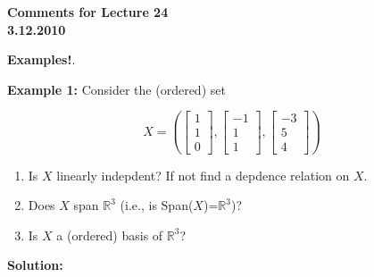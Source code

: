 \documentclass[12pt]{article}
\begin{document}
\begin{center}
{\large \bf Comments for Lecture 24}\\
\bf{3.12.2010}
\end{center}


\begin{center}{\LARGE \bf Examples!}.\end{center}


{\bf Example 1:}  Consider the (ordered) set 

\[X = \left( \left[ \begin{array}{r} 1 \\ 1  \\ 0  \end{array} \right], \left[ \begin{array}{r} -1 \\  1 \\ 1  \end{array} \right], \left[ \begin{array}{r}-3 \\ 5  \\ 4  \end{array} \right] \right) \]

\begin{enumerate}
\item Is $X$ linearly indepdent?  If not find a depdence relation on $X$.
\item Does $X$ span $\mathbb{R}^3$ (i.e., is Span($X$)=$\mathbb{R}^3$)?
\item Is $X$ a (ordered) basis of $\mathbb{R}^3$?
\end{enumerate}

{\bf Solution:}
\end{document}
